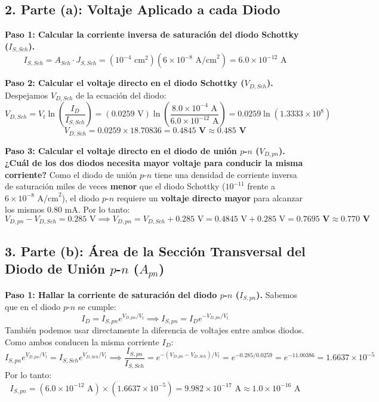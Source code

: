 \documentclass[11pt,a4paper]{article}
\begin{document}
\subsection*{2. Parte (a): Voltaje Aplicado a cada Diodo}
\textbf{Paso 1: Calcular la corriente inversa de saturación del diodo Schottky ($I_{S,Sch}$).}
\[
I_{S,Sch} = A_{Sch} \cdot J_{S,Sch} = (10^{-4}\text{ cm}^2)(6 \times 10^{-8}\text{ A/cm}^2) = 6.0 \times 10^{-12}\text{ A}
\]

\textbf{Paso 2: Calcular el voltaje directo en el diodo Schottky ($V_{D,Sch}$).}
Despejamos $V_{D,Sch}$ de la ecuación del diodo:
\[
V_{D,Sch} = V_t \ln\left(\frac{I_D}{I_{S,Sch}}\right) = (0.0259\text{ V}) \ln\left(\frac{8.0 \times 10^{-4}\text{ A}}{6.0 \times 10^{-12}\text{ A}}\right) = 0.0259 \ln(1.3333 \times 10^8)
\]
\[
V_{D,Sch} = 0.0259 \times 18.70836 = \mathbf{0.4845\text{ V} \approx 0.485\text{ V}}
\]

\textbf{Paso 3: Calcular el voltaje directo en el diodo de unión $p$-$n$ ($V_{D,pn}$).}
\textbf{¿Cuál de los dos diodos necesita mayor voltaje para conducir la misma corriente?}
Como el diodo de unión $p$-$n$ tiene una densidad de corriente inversa de saturación miles de veces \textbf{menor} que el diodo Schottky ($10^{-11}$ frente a $6 \times 10^{-8}\text{ A/cm}^2$), el diodo $p$-$n$ requiere un \textbf{voltaje directo mayor} para alcanzar los mismos $0.80\text{ mA}$. Por lo tanto:
\[
V_{D,pn} - V_{D,Sch} = 0.285\text{ V} \implies V_{D,pn} = V_{D,Sch} + 0.285\text{ V} = 0.4845\text{ V} + 0.285\text{ V} = \mathbf{0.7695\text{ V} \approx 0.770\text{ V}}
\]

\subsection*{3. Parte (b): Área de la Sección Transversal del Diodo de Unión $p$-$n$ ($A_{pn}$)}
\textbf{Paso 1: Hallar la corriente de saturación del diodo $p$-$n$ ($I_{S,pn}$).}
Sabemos que en el diodo $p$-$n$ se cumple:
\[
I_D = I_{S,pn} e^{V_{D,pn}/V_t} \implies I_{S,pn} = I_D e^{-V_{D,pn}/V_t}
\]
También podemos usar directamente la diferencia de voltajes entre ambos diodos. Como ambos conducen la misma corriente $I_D$:
\[
I_{S,pn} e^{V_{D,pn}/V_t} = I_{S,Sch} e^{V_{D,Sch}/V_t} \implies \frac{I_{S,pn}}{I_{S,Sch}} = e^{-(V_{D,pn} - V_{D,Sch})/V_t} = e^{-0.285 / 0.0259} = e^{-11.00386} = 1.6637 \times 10^{-5}
\]
Por lo tanto:
\[
I_{S,pn} = (6.0 \times 10^{-12}\text{ A}) \times (1.6637 \times 10^{-5}) = 9.982 \times 10^{-17}\text{ A} \approx 1.0 \times 10^{-16}\text{ A}
\]
\end{document}
